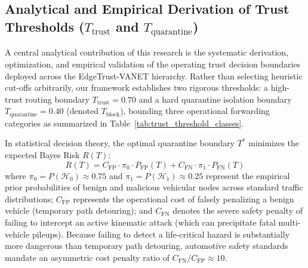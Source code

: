 \documentclass[conference]{IEEEtran}
\begin{document}
\subsection{Analytical and Empirical Derivation of Trust Thresholds ($T_{\text{trust}}$ and $T_{\text{quarantine}}$)}
\label{sec:bayes_derivation}

A central analytical contribution of this research is the systematic derivation, optimization, and empirical validation of the operating trust decision boundaries deployed across the EdgeTrust-VANET hierarchy. Rather than selecting heuristic cut-offs arbitrarily, our framework establishes two rigorous thresholds: a high-trust routing boundary $T_{\text{trust}} = 0.70$ and a hard quarantine isolation boundary $T_{\text{quarantine}} = 0.40$ (denoted $T_{\text{block}}$), bounding three operational forwarding categories as summarized in Table~\ref{tab:trust_threshold_classes}.

\begin{table}[htbp]
\centering
\caption{Trust-Score Decision Categories and Corresponding Network Actions}
\label{tab:trust_threshold_classes}
\end{table}

In statistical decision theory, the optimal quarantine boundary $T^*$ minimizes the expected Bayes Risk $R(T)$:
\begin{equation}
R(T) = C_{\text{FP}} \cdot \pi_0 \cdot P_{\text{FP}}(T) + C_{\text{FN}} \cdot \pi_1 \cdot P_{\text{FN}}(T)
\label{eq:bayes_risk}
\end{equation}
where $\pi_0 = P(\mathcal{H}_0) \approx 0.75$ and $\pi_1 = P(\mathcal{H}_1) \approx 0.25$ represent the empirical prior probabilities of benign and malicious vehicular nodes across standard traffic distributions; $C_{\text{FP}}$ represents the operational cost of falsely penalizing a benign vehicle (temporary path detouring); and $C_{\text{FN}}$ denotes the severe safety penalty of failing to intercept an active kinematic attack (which can precipitate fatal multi-vehicle pileups). Because failing to detect a life-critical hazard is substantially more dangerous than temporary path detouring, automotive safety standards mandate an asymmetric cost penalty ratio of $C_{\text{FN}} / C_{\text{FP}} \approx 10$.
\end{document}
